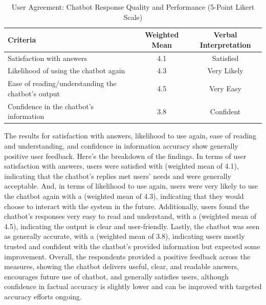 \begin{refsection}
\begin{table}[H]
    \centering
    \caption{User Agreement: Chatbot Response Quality and Performance (5-Point Likert Scale)}
    \label{tab:user_feedback_table}
    \begin{tabular}{p{7cm} c c}
        \hline
        \textbf{Criteria} & \textbf{Weighted Mean} & \textbf{Verbal Interpretation} \\
        \hline
        Satisfaction with answers & 4.1 & Satisfied \\
        \hline
        Likelihood of using the chatbot again & 4.3 & Very Likely \\
        \hline
        Ease of reading/understanding the chatbot’s output & 4.5 & Very Easy \\
        \hline
        Confidence in the chatbot’s information & 3.8 & Confident \\
        \hline
    \end{tabular}
\end{table}

The results for satisfaction with answers, likelihood to use again, ease of reading and understanding, and confidence in information accuracy show generally positive user feedback. Here’s the breakdown of the findings. In terms of user satisfaction with answers, users were satisfied with (weighted mean of 4.1), indicating that the chatbot’s replies met users’ needs and were generally acceptable. And, in terms of  likelihood to use again, users were very likely to use the chatbot again with a (weighted mean of 4.3), indicating that they would choose to interact with the system in the future. Additionally, users found the chatbot’s responses very easy to read and understand, with a (weighted mean of 4.5), indicating the output is clear and user-friendly. Lastly, the chatbot was seen as generally accurate, with a (weighted mean of 3.8), indicating users mostly trusted and confident with the chatbot’s provided information but expected some improvement. Overall, the respondents provided a positive feedback across the measures, showing the chatbot delivers useful, clear, and readable answers, encourages future use of chatbot, and generally satisfies users, although confidence in factual accuracy is slightly lower and can be improved with targeted accuracy efforts ongoing.

\clearpage

\printbibliography[heading=subbibintoc, title={\centering Notes}]
\end{refsection}